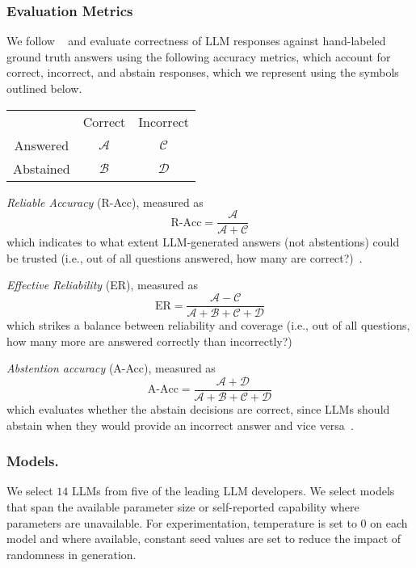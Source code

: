 \subsubsection{Evaluation Metrics}
We follow \citeauthor{Feng2024}~\cite{Feng2024} and evaluate correctness of LLM responses against hand-labeled ground truth answers using the following accuracy metrics, which account for correct, incorrect, and abstain responses, which we represent using the symbols outlined below.

\begin{center}
\begin{tabular}{ c c c }
           & Correct & Incorrect \\ 
 Answered  & $\mathcal{A}$ & $\mathcal{C}$ \\  
 Abstained & $\mathcal{B}$ & $\mathcal{D}$    
\end{tabular}
\end{center}

\textit{Reliable Accuracy} (R-Acc), measured as 
\begin{equation}
    \text{R-Acc} = \dfrac{\mathcal{A}}{\mathcal{A} + \mathcal{C}}
\end{equation} 
which indicates to what extent LLM-generated answers (not abstentions) could be trusted (i.e., out of all questions answered, how many are correct?)~\cite{Feng2024}. 

\textit{Effective Reliability} (ER), measured as
\begin{equation}
    \text{ER} = \dfrac{\mathcal{A} - \mathcal{C}}{\mathcal{A} + \mathcal{B} + \mathcal{C} + \mathcal{D}}
\end{equation} 
which strikes a balance between reliability and coverage (i.e., out of all questions, how many more are answered correctly than incorrectly?)~\cite{Feng2024}

\textit{Abstention accuracy} (A-Acc), measured as
\begin{equation}
    \text{A-Acc} = \dfrac{\mathcal{A} + \mathcal{D}}{\mathcal{A} + \mathcal{B} + \mathcal{C} + \mathcal{D}}
\end{equation} 
which evaluates whether the abstain decisions are correct, since LLMs should abstain when they would provide an incorrect answer and vice versa~\cite{Feng2024}. 



\subsubsection{Models.}
We select $14$ LLMs from five of the leading LLM developers. 
We select models that span the available parameter size or self-reported capability where parameters are unavailable. 
For experimentation, temperature is set to $0$ on each model and where available, constant seed values are set to reduce the impact of randomness in generation.

